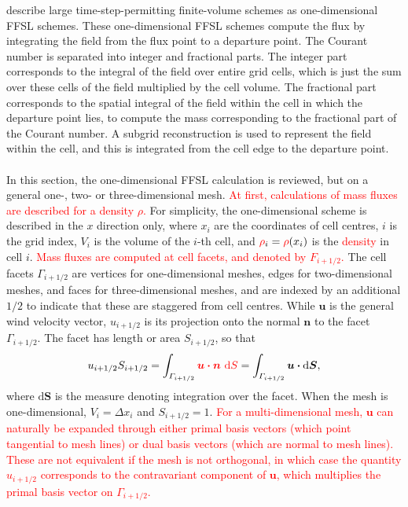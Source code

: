 \documentclass{ametsocV6.1}
\newcommand{\change}[1]{\textcolor{red}{#1}}
\begin{document}
\citet{lin1996ffsl} describe large time-step-permitting finite-volume schemes as one-dimensional FFSL schemes. These one-dimensional FFSL schemes compute the flux by integrating the field from the flux point to a departure point. The Courant number is separated into integer and fractional parts. The integer part corresponds to the integral of the field over entire grid cells, which is just the sum over these cells of the field multiplied by the cell volume. The fractional part corresponds to the spatial integral of the field within the cell in which the departure point lies, to compute the mass corresponding to the fractional part of the Courant number. A subgrid reconstruction is used to represent the field within the cell, and this is integrated from the cell edge to the departure point. \\
\\
In this section, the one-dimensional FFSL calculation is reviewed, but on a general one-, two- or three-dimensional mesh.
\change{At first, calculations of mass fluxes are described for a density $\rho$.}
For simplicity, the one-dimensional scheme is described in the $x$ direction only, where $x_i$ are the coordinates of cell centres, $i$ is the grid index, $V_i$ is the volume of the $i$-th cell, and $\change{\rho}_i=\change{\rho}(x_i)$ is the \change{density} in cell $i$.
\change{Mass fluxes are computed at cell facets, and denoted by $F_{i+1/2}$.}
The cell facets $\varGamma_{i+1/2}$ are vertices for one-dimensional meshes, edges for two-dimensional meshes, and faces for three-dimensional meshes, and are indexed by an additional $1/2$ to indicate that these are staggered from cell centres.
While $\bm{u}$ is the general wind velocity vector, $u_{i+1/2}$ is its projection onto the normal $\bm{n}$ to the facet $\varGamma_{i+1/2}$.
The facet has length or area $S_{i+1/2}$, so that
\begin{equation} \label{eqn:u_normal}
u_{i+1/2} S_{i+1/2} =
\int_{\varGamma_{i+1/2}} \change{\bm{u \cdot n} \ \mathrm{d}S} = \int_{\varGamma_{i+1/2}} \bm{u} \bm{\cdot} \mathrm{d}\bm{S},
\end{equation}
where $\mathrm{d}\bm{S}$ is the measure denoting integration over the facet.
When the mesh is one-dimensional, $V_i=\Delta x_i$ and $S_{i+1/2}=1$.
\change{For a multi-dimensional mesh, $\bm{u}$ can naturally be expanded through either primal basis vectors (which point tangential to mesh lines) or dual basis vectors (which are normal to mesh lines).
These are not equivalent if the mesh is not orthogonal, in which case the quantity $u_{i+1/2}$ corresponds to the contravariant component of $\bm{u}$, which multiplies the primal basis vector on $\varGamma_{i+1/2}$.}
\end{document}

